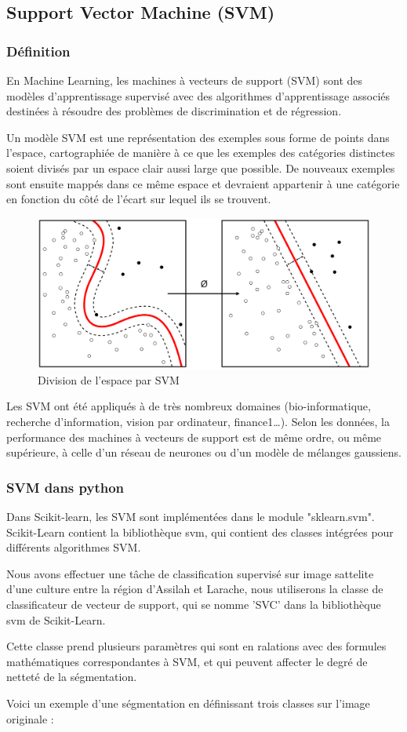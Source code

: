 \documentclass[12pt, openany]{report}
\begin{document}
\subsection{Support Vector Machine (SVM)}

\subsubsection{Définition}
En Machine Learning, les machines à vecteurs de support (SVM) sont des modèles d'apprentissage supervisé avec des algorithmes d'apprentissage associés destinées à résoudre des problèmes de discrimination et de régression. 
\par
Un modèle SVM est une représentation des exemples sous forme de points
dans l'espace, cartographiée de manière à ce que les exemples des catégories distinctes soient divisés par un espace clair aussi large que possible. De nouveaux exemples sont ensuite mappés dans ce même espace et devraient appartenir à une catégorie en fonction du côté de l'écart sur lequel ils se trouvent.
\begin{figure}[h]
\centering
\includegraphics[scale=0.2]{svm.png}
\caption{Division de l'espace par SVM}
\end{figure}

\par
Les SVM ont été appliqués à de très nombreux domaines (bio-informatique, recherche d'information, vision par ordinateur, finance1…). Selon les données, la performance des machines à vecteurs de support est de même ordre, ou même supérieure, à celle d'un réseau de neurones ou d'un modèle de mélanges gaussiens.

\subsubsection{SVM dans python}
Dans Scikit-learn, les SVM sont implémentées dans le module "sklearn.svm".
Scikit-Learn contient la bibliothèque svm, qui contient des classes intégrées pour différents algorithmes SVM. 
\par
Nous avons effectuer une tâche de classification supervisé sur image sattelite d'une culture entre la région d'Assilah et Larache, nous utiliserons la classe de classificateur de vecteur de support, qui se nomme 'SVC' dans la bibliothèque svm de Scikit-Learn.
\par
Cette classe prend plusieurs paramètres qui sont en ralations avec des formules mathématiques correspondantes à SVM, et qui peuvent affecter le degré de netteté de la ségmentation.
\par
Voici un exemple d'une ségmentation en définissant trois classes sur l'image originale : 
\end{document}
